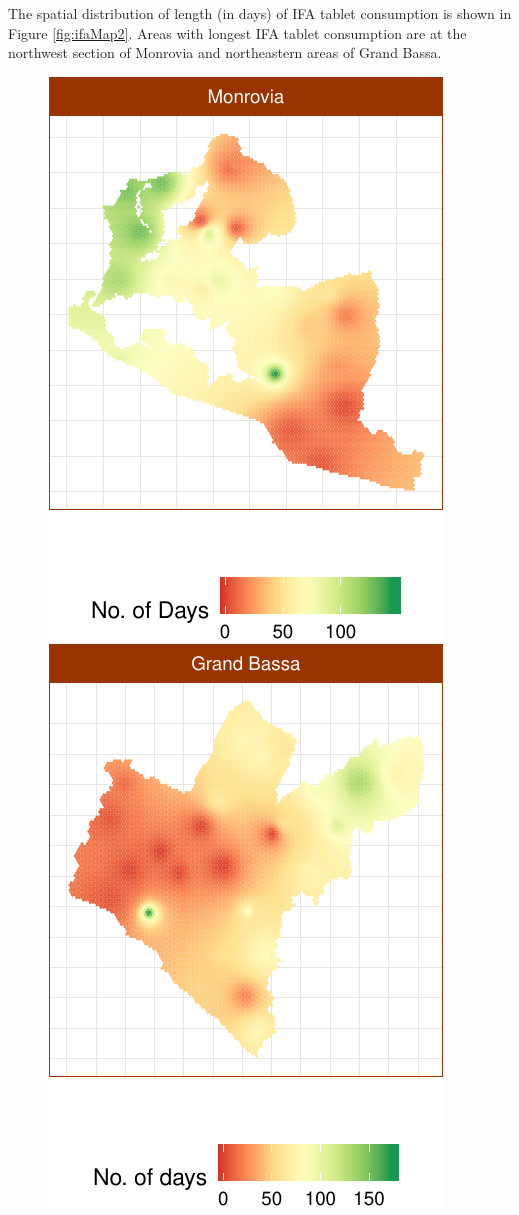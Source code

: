 \documentclass[12pt,a4paper]{article}
\theoremstyle{definition}
\theoremstyle{definition}
\theoremstyle{definition}
\theoremstyle{remark}
\begin{document}
The spatial distribution of length (in days) of IFA tablet consumption
is shown in Figure \ref{fig:ifaMap2}. Areas with longest IFA tablet
consumption are at the northwest section of Monrovia and northeastern
areas of Grand Bassa.

\begin{figure}[H]

{\centering \includegraphics{liberiaCoverageReport_files/figure-latex/ifaMap2-1} \includegraphics{liberiaCoverageReport_files/figure-latex/ifaMap2-2} 

}
\end{figure}
\end{document}
